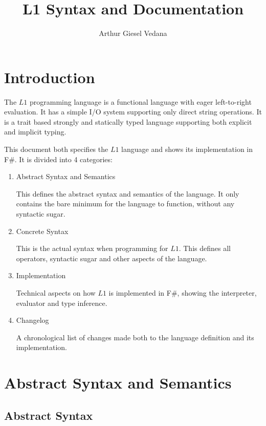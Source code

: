 \documentclass{article}
\author{Arthur Giesel Vedana}
\title{L1 Syntax and Documentation}
\begin{document}
\maketitle
{}
\newpage

\tableofcontents
\newpage

\section*{Introduction}
The $L1$ programming language is a functional language with eager left-to-right evaluation.
It has a simple I/O system supporting only direct string operations. 
It is a trait based strongly and statically typed language supporting both explicit and implicit typing.


This document both specifies the $L1$ language and shows its implementation in F\#.
It is divided into 4 categories:
\begin{enumerate}
    \item Abstract Syntax and Semantics
    
        This defines the abstract syntax and semantics of the language.
        It only contains the bare minimum for the language to function, without any syntactic sugar. 
    \item Concrete Syntax
    
        This is the actual syntax when programming for $L1$.
        This defines all operators, syntactic sugar and other aspects of the language.
    \item Implementation
    
        Technical aspects on how $L1$ is implemented in F\#, showing the interpreter, evaluator and type inference.
    \item Changelog
    
        A chronological list of changes made both to the language definition and its implementation.
\end{enumerate}

\newpage
{}
\section{Abstract Syntax and Semantics}

\subsection{Abstract Syntax}
\end{document}
